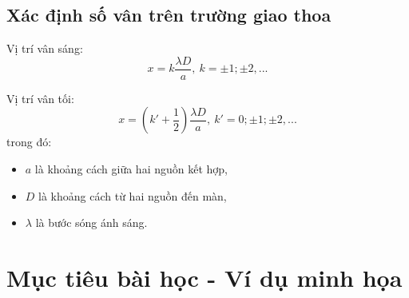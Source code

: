 \subsection{Xác định số vân trên trường giao thoa}


Vị trí vân sáng:
\begin{equation}
	x=k\dfrac{\lambda D}{a},\ k=\pm 1; \pm 2,...
\end{equation}

Vị trí vân tối: 
\begin{equation}
	x=\left(k'+\dfrac{1}{2}\right) \dfrac{\lambda D}{a},\ k'=0; \pm 1; \pm 2,... 
\end{equation}
trong đó:
\begin{itemize}
	\item $a$ là khoảng cách giữa hai nguồn kết hợp,
	\item $D$ là khoảng cách từ hai nguồn đến màn,
	\item $\lambda$ là bước sóng ánh sáng.
\end{itemize} 

\section{Mục tiêu bài học - Ví dụ minh họa}

